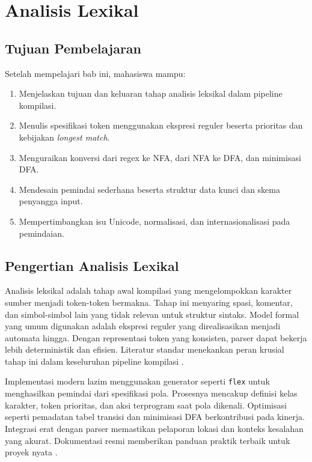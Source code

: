 \documentclass[../main.tex]{subfiles}
\begin{document}
\chapter{Analisis Lexikal}

\section{Tujuan Pembelajaran}
Setelah mempelajari bab ini, mahasiswa mampu:
\begin{enumerate}[label=\alph*)]
  \item Menjelaskan tujuan dan keluaran tahap analisis leksikal dalam pipeline kompilasi.
  \item Menulis spesifikasi token menggunakan ekspresi reguler beserta prioritas dan kebijakan \emph{longest match}.
  \item Menguraikan konversi dari regex ke NFA, dari NFA ke DFA, dan minimisasi DFA.
  \item Mendesain pemindai sederhana beserta struktur data kunci dan skema penyangga input.
  \item Mempertimbangkan isu Unicode, normalisasi, dan internasionalisasi pada pemindaian.
\end{enumerate}

\section{Pengertian Analisis Lexikal}
Analisis leksikal adalah tahap awal kompilasi yang mengelompokkan karakter sumber menjadi token-token bermakna. Tahap ini menyaring spasi, komentar, dan simbol-simbol lain yang tidak relevan untuk struktur sintaks. Model formal yang umum digunakan adalah ekspresi reguler yang direalisasikan menjadi automata hingga. Dengan representasi token yang konsisten, parser dapat bekerja lebih deterministik dan efisien. Literatur standar menekankan peran krusial tahap ini dalam keseluruhan pipeline kompilasi \citep{Mogensen2010,Wirth1996}.

Implementasi modern lazim menggunakan generator seperti \texttt{flex} untuk menghasilkan pemindai dari spesifikasi pola. Prosesnya mencakup definisi kelas karakter, token prioritas, dan aksi terprogram saat pola dikenali. Optimisasi seperti pemadatan tabel transisi dan minimisasi DFA berkontribusi pada kinerja. Integrasi erat dengan parser memastikan pelaporan lokasi dan konteks kesalahan yang akurat. Dokumentasi resmi memberikan panduan praktik terbaik untuk proyek nyata \citep{FlexManual}.
\end{document}
